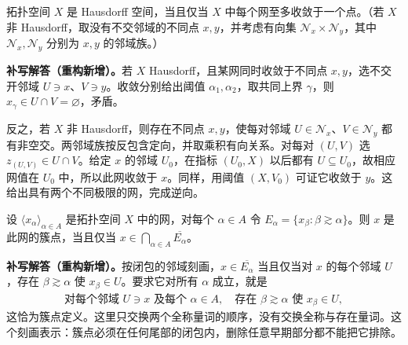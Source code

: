 \documentclass[../../main.tex]{subfiles}%
\begin{document}
\begin{exercise}\label{exercise:ch04-hausdorff-net-limits}
拓扑空间 $X$ 是 Hausdorff 空间，当且仅当 $X$ 中每个网至多收敛于一个点。（若 $X$ 非 Hausdorff，取没有不交邻域的不同点 $x,y$，并考虑有向集 $\mathcal N_x\times\mathcal N_y$，其中 $\mathcal N_x,\mathcal N_y$ 分别为 $x,y$ 的邻域族。）
\end{exercise}
\begin{solution}
\textbf{补写解答（重构新增）。}若 $X$ Hausdorff，且某网同时收敛于不同点 $x,y$，选不交开邻域 $U\ni x$、$V\ni y$。收敛分别给出阈值 $\alpha_1,\alpha_2$，取共同上界 $\gamma$，则 $x_\gamma\in U\cap V=\varnothing$，矛盾。

反之，若 $X$ 非 Hausdorff，则存在不同点 $x,y$，使每对邻域 $U\in\mathcal N_x$、$V\in\mathcal N_y$ 都有非空交。两邻域族按反包含定向，并取乘积有向关系。对每对 $(U,V)$ 选 $z_{(U,V)}\in U\cap V$。给定 $x$ 的邻域 $U_0$，在指标 $(U_0,X)$ 以后都有 $U\subseteq U_0$，故相应网值在 $U_0$ 中，所以此网收敛于 $x$。同样，用阈值 $(X,V_0)$ 可证它收敛于 $y$。这给出具有两个不同极限的网，完成逆向。
\end{solution}
\begin{exercise}\label{exercise:ch04-tail-closures}
设 $\langle x_\alpha\rangle_{\alpha\in A}$ 是拓扑空间 $X$ 中的网，对每个 $\alpha\in A$ 令 $E_\alpha=\{x_\beta:\beta\gtrsim\alpha\}$。则 $x$ 是此网的簇点，当且仅当 $x\in\bigcap_{\alpha\in A}\overline{E_\alpha}$。
\end{exercise}
\begin{solution}
\textbf{补写解答（重构新增）。}按闭包的邻域刻画，$x\in\overline{E_\alpha}$ 当且仅当对 $x$ 的每个邻域 $U$，存在 $\beta\gtrsim\alpha$ 使 $x_\beta\in U$。要求它对所有 $\alpha$ 成立，就是
\begin{align*}
\text{对每个邻域 }U\ni x\text{ 及每个 }\alpha\in A,
\quad\text{存在 }\beta\gtrsim\alpha\text{ 使 }x_\beta\in U,
\end{align*}
这恰为簇点定义。这里只交换两个全称量词的顺序，没有交换全称与存在量词。这个刻画表示：簇点必须在任何尾部的闭包内，删除任意早期部分都不能把它排除。
\end{solution}
\end{document}
